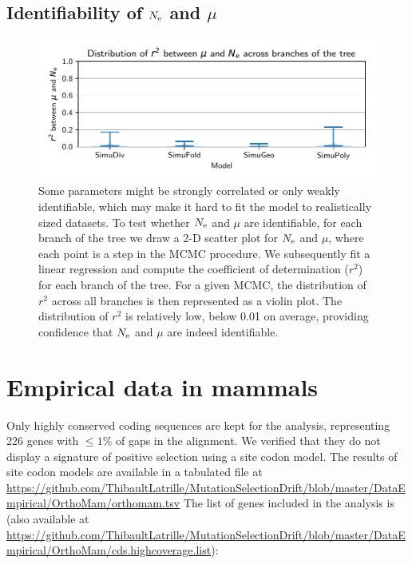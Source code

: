 \documentclass{article}
\begin{document}
	\subsection{Identifiability of $\Ne$ and $\mu$}
	\label{subsec:simulation-identifiability}

	\begin{figure}[H]
		\centering
		\includegraphics[width=\linewidth, page=1]{simulations/identifiability}
		\caption[Identifiability of $\Ne$ and $\mu$]{
			Some parameters might be strongly correlated or only weakly identifiable, which may make it hard to fit the model to realistically sized datasets.
			To test whether $\Ne$ and $\mu$ are identifiable, for each branch of the tree we draw a 2-D scatter plot for $\Ne$ and $\mu$, where each point is a step in the MCMC procedure.
			We subsequently fit a linear regression and compute the coefficient of determination ($r^2$) for each branch of the tree.
			For a given MCMC, the distribution of $r^2$ across all branches is then represented as a violin plot.
			The distribution of $r^2$ is relatively low, below 0.01 on average, providing confidence that $\Ne$ and $\mu$ are indeed identifiable.}
	\end{figure}

	\section{Empirical data in mammals}
	\label{sec:empirical-data-in-mammals}

	Only highly conserved coding sequences are kept for the analysis, representing 226 {genes} with $\leq 1\%$ of gaps in the alignment.
	We verified that they do not display a signature of positive selection using a site codon model. The results of site codon models are available in a tabulated file at \url{https://github.com/ThibaultLatrille/MutationSelectionDrift/blob/master/DataEmpirical/OrthoMam/orthomam.tsv}
	The list of genes included in the analysis is (also available at \url{https://github.com/ThibaultLatrille/MutationSelectionDrift/blob/master/DataEmpirical/OrthoMam/cds.highcoverage.list}):\\
	 \\
\end{document}
